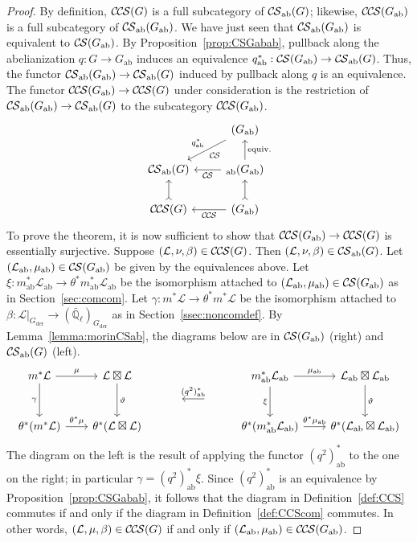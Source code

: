 \documentclass[10pt]{amsart}
\theoremstyle{plain}
\theoremstyle{definition}
\newcommand{\EE}{\mathbb{\bar Q}_\ell}
\newcommand{\der}{_{\operatorname{der}}}
\newcommand{\ab}{_{\operatorname{ab}}}
\newcommand{\cs}[1]{{\mathcal{#1}}}
\newcommand{\CS}{{\mathcal{C\hskip-0.8pt S}}}
\newcommand{\CCS}{{\mathcal{C\hskip-.8pt C\hskip-0.8pt S}}}
\begin{document}
\begin{proof}
By definition, $\CCS(G)$ is a full subcategory of $\CS\ab(G)$; likewise, $\CCS(G\ab)$ is a full subcategory of $\CS\ab(G\ab)$.
We have just seen that $\CS\ab(G\ab)$ is equivalent to $\CS(G\ab)$.
By Proposition~\ref{prop:CSGabab}, pullback along the abelianization $q : G \to G\ab$ induces an equivalence $q^*\ab : \CS(G\ab)\to \CS\ab(G)$.
Thus, the functor $\CS\ab(G\ab)\to \CS\ab(G)$ induced by pullback along $q$ is an equivalence.
The functor $\CCS(G\ab)\to \CCS(G)$ under consideration is the restriction of $\CS\ab(G\ab)\to \CS\ab(G)$ to the subcategory $\CCS(G\ab)$. 
\[
\begin{tikzcd}
{} & \arrow{dl}[swap]{q^*\ab} \CS(G\ab)\\
\CS\ab(G) & \arrow{l} \CS\ab(G\ab) \arrow{u}[swap]{\text{equiv.}}\\
\CCS(G) \arrow[>->]{u} & \arrow{l} \CCS(G\ab) \arrow[>->]{u}
\end{tikzcd}
\]
To prove the theorem, it is now sufficient to show that $\CCS(G\ab)\to \CCS(G)$ is essentially surjective.
Suppose $(\cs{L},\nu,\beta)\in \CCS(G)$.
Then $(\cs{L},\nu,\beta)\in \CS\ab(G)$.
Let $(\cs{L}\ab,\mu\ab)\in \CS(G\ab)$ be given by the equivalences above.
Let $\xi : m\ab^*\cs{L}\ab \to \theta^* m\ab^*\cs{L}\ab$ be the isomorphism attached to $(\cs{L}\ab,\mu\ab)\in \CS(G\ab)$ as in Section~\ref{sec:comcom}.
Let $\gamma : m^*\cs{L} \to \theta^* m^*\cs{L}$ be the isomorphism attached to $\beta : \cs{L}\vert_{G\der} \to (\EE)_{G\der}$ as in Section~\ref{ssec:noncomdef}.
By Lemma~\ref{lemma:morinCSab}, the diagrams below are in $\CS(G\ab)$ (right) and $\CS\ab(G)$ (left).
\[
  \begin{tikzcd}[row sep=10, column sep = 20]
   m^*\cs{L} \arrow{dd}[swap]{\gamma} \arrow{r}{\mu} 
 & \cs{L}\boxtimes\cs{L} \arrow{dd}{\vartheta}
 &&&  m\ab^*\cs{L}\ab \arrow{dd}[swap]{\xi} \arrow{r}{\mu\ab} 
   & \cs{L}\ab\boxtimes\cs{L}\ab \arrow{dd}{\vartheta}\\
%
 && \  &\arrow{l}[swap]{(q^2)^*\ab}  &  &\\ 
%
   \theta^*(m^*\cs{L}) \arrow{r}{{\theta}^*\mu} 
&  \theta^*(\cs{L}\boxtimes\cs{L}) 
 &&&   \theta^*(m\ab^*\cs{L}\ab) \arrow{r}{{\theta}^*\mu\ab} 
 &  \theta^*(\cs{L}\ab\boxtimes\cs{L}\ab)
 \end{tikzcd}
\]
The diagram on the left is the result of applying the functor $(q^2)^*\ab$ to the one on the right; in particular $\gamma = (q^2)^*\ab \xi$.
Since $(q^2)^*\ab$ is an equivalence by Proposition~\ref{prop:CSGabab}, it follows that the diagram in Definition~\ref{def:CCS} commutes if and only if the diagram in Definition~\ref{def:CCScom} commutes. 
In other words, $(\cs{L},\mu,\beta)\in \CCS(G)$ if and only if $(\cs{L}\ab,\mu\ab)\in \CCS(G\ab)$.

\end{proof}
\end{document}
